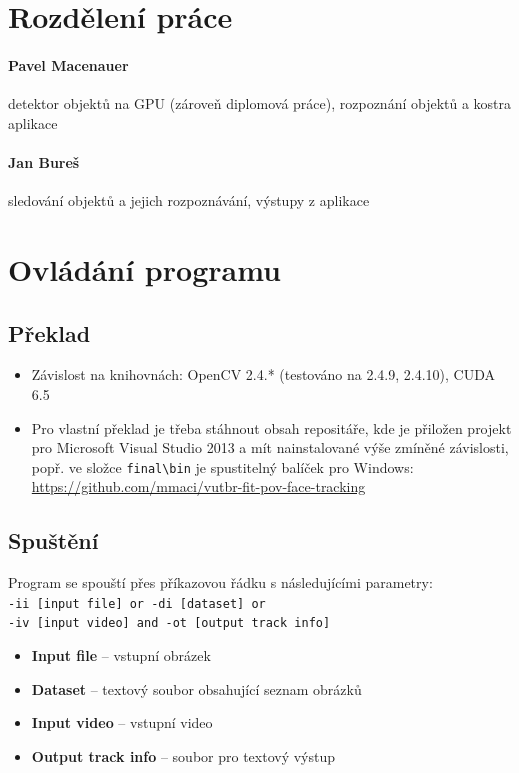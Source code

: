 \documentclass[12pt,a4paper,titlepage,final]{report}
\begin{document}
\section{Rozdělení práce}
\paragraph{Pavel Macenauer} detektor objektů na GPU (zároveň diplomová práce), rozpoznání objektů a kostra aplikace

\paragraph{Jan Bureš} sledování objektů a jejich rozpoznávání, výstupy z aplikace

\section{Ovládání programu}

\subsection{Překlad}

\begin{itemize}
\item Závislost na knihovnách: OpenCV 2.4.* (testováno na 2.4.9, 2.4.10), CUDA 6.5 \\

\item Pro vlastní překlad je třeba stáhnout obsah repositáře, kde je přiložen projekt pro Microsoft Visual Studio 2013 a mít nainstalované výše zmíněné závislosti, popř. ve složce \verb|final\bin| je spustitelný balíček pro Windows:\\  \url{https://github.com/mmaci/vutbr-fit-pov-face-tracking}
\end{itemize}


\subsection{Spuštění}

Program se spouští přes příkazovou řádku s následujícími parametry: \\
\verb|-ii [input file] or -di [dataset] or| \\ \verb|-iv [input video] and -ot [output track info]|

\begin{itemize}
\item \textbf{Input file} – vstupní obrázek
\item \textbf{Dataset} – textový soubor obsahující seznam obrázků
\item \textbf{Input video} – vstupní video
\item \textbf{Output track info} – soubor pro textový výstup
\end{itemize}
\end{document}
